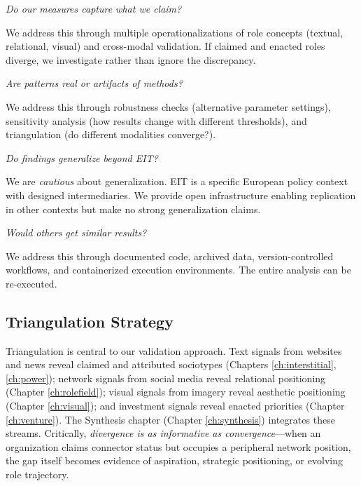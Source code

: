 \documentclass[../main.tex]{subfiles}
\begin{document}
\begin{description}[leftmargin=0.5cm, itemsep=0.4em]
\item[Construct validity] \textit{Do our measures capture what we claim?}

We address this through multiple operationalizations of role concepts (textual, relational, visual) and cross-modal validation. If claimed and enacted roles diverge, we investigate rather than ignore the discrepancy.

\item[Internal validity] \textit{Are patterns real or artifacts of methods?}

We address this through robustness checks (alternative parameter settings), sensitivity analysis (how results change with different thresholds), and triangulation (do different modalities converge?).

\item[External validity] \textit{Do findings generalize beyond EIT?}

We are \emph{cautious} about generalization. EIT is a specific European policy context with designed intermediaries. We provide open infrastructure enabling replication in other contexts but make no strong generalization claims.

\item[Reliability] \textit{Would others get similar results?}

We address this through documented code, archived data, version-controlled workflows, and containerized execution environments. The entire analysis can be re-executed.
\end{description}

\subsection{Triangulation Strategy}

Triangulation is central to our validation approach. Text signals from websites and news reveal claimed and attributed sociotypes (Chapters \ref{ch:interstitial}, \ref{ch:power}); network signals from social media reveal relational positioning (Chapter \ref{ch:rolefield}); visual signals from imagery reveal aesthetic positioning (Chapter \ref{ch:visual}); and investment signals reveal enacted priorities (Chapter \ref{ch:venture}). The Synthesis chapter (Chapter \ref{ch:synthesis}) integrates these streams. Critically, \emph{divergence is as informative as convergence}---when an organization claims connector status but occupies a peripheral network position, the gap itself becomes evidence of aspiration, strategic positioning, or evolving role trajectory.
\end{document}
